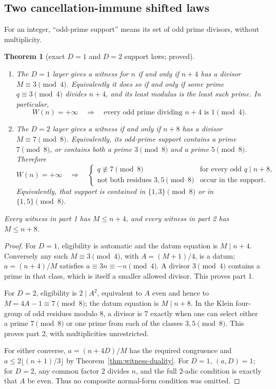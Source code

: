 \documentclass[10pt,reqno]{amsart}
\newtheorem{theorem}{Theorem}[section]
\theoremstyle{definition}
\newcommand{\1}{\mathbf 1}
\begin{document}
\subsection{Two cancellation-immune shifted laws}
For an integer, ``odd-prime support'' means its set of odd prime divisors,
without multiplicity.
\begin{theorem}[exact $D=1$ and $D=2$ support laws; proved]
\label{thm:shifted-support-laws}
\begin{enumerate}[leftmargin=*]
\item The $D=1$ layer gives a witness for $n$ if and only if $n+4$ has a
divisor $M\equiv3\pmod4$.  Equivalently it does so if and only if some
prime $q\equiv3\pmod4$ divides $n+4$, and its least modulus is the least
such prime.  In particular,
\begin{equation}\tag{64.4}
 W(n)=+\infty\quad\Longrightarrow\quad
 \text{every odd prime dividing }n+4\text{ is }1\pmod4.
\end{equation}
\item The $D=2$ layer gives a witness if and only if $n+8$ has a divisor
$M\equiv7\pmod8$.  Equivalently, its odd-prime support contains a prime
$7\pmod8$, or contains both a prime $3\pmod8$ and a prime $5\pmod8$.
Therefore
\begin{equation}\tag{64.5}
 W(n)=+\infty\quad\Longrightarrow\quad
 \begin{cases}
 q\not\equiv7\pmod8&\text{for every odd }q\mid n+8,\\
 \text{not both residues }3,5\pmod8&\text{occur in the support.}
 \end{cases}
\end{equation}
Equivalently, that support is contained in $\{1,3\}\pmod8$ or in
$\{1,5\}\pmod8$.
\end{enumerate}
Every witness in part 1 has $M\leq n+4$, and every witness in part 2 has
$M\leq n+8$.
\end{theorem}
\begin{proof}
For $D=1$, eligibility is automatic and the datum equation is
$M\mid n+4$.  Conversely any such $M\equiv3\pmod4$, with
$A=(M+1)/4$, is a datum; $a=(n+4)/M$ satisfies
$a\equiv3n\equiv-n\pmod4$.  A divisor $3\pmod4$ contains a prime in that
class, which is itself a smaller allowed divisor.  This proves part 1.

For $D=2$, eligibility is $2\mid A^2$, equivalent to $A$ even and hence to
$M=4A-1\equiv7\pmod8$; the datum equation is $M\mid n+8$.  In the Klein
four-group of odd residues modulo $8$, a divisor is $7$ exactly when one
can select either a prime $7\pmod8$ or one prime from each of the classes
$3,5\pmod8$.  This proves part 2, with multiplicities unrestricted.

For either converse, $a=(n+4D)/M$ has the required congruence and
$a\leq2\lfloor(n+1)/3\rfloor$ by Theorem~\ref{thm:witness-duality}.
For $D=1$, $(a,D)=1$; for $D=2$, any common factor $2$ divides $n$, and
the full $2$-adic condition is exactly that $A$ be even.  Thus no
composite normal-form condition was omitted.
\end{proof}
\end{document}
